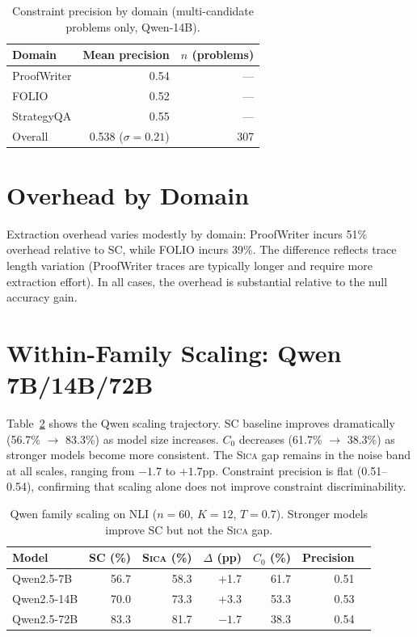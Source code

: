 \documentclass[11pt,a4paper]{article}
\newcommand{\sica}{\textsc{Sica}}
\newcommand{\czero}{C_0}
\begin{document}
\begin{table}[h]
\centering
\caption{Constraint precision by domain (multi-candidate problems only, Qwen-14B).}
\label{tab:precision}
\small
\begin{tabular}{lrr}
\toprule
\textbf{Domain} & \textbf{Mean precision} & \textbf{$n$ (problems)} \\
\midrule
ProofWriter & 0.54 & --- \\
FOLIO & 0.52 & --- \\
StrategyQA & 0.55 & --- \\
\midrule
Overall & 0.538 ($\sigma = 0.21$) & 307 \\
\bottomrule
\end{tabular}
\end{table}

\section{Overhead by Domain}
\label{app:overhead}

Extraction overhead varies modestly by domain: ProofWriter incurs 51\% overhead relative to SC, while FOLIO incurs 39\%. The difference reflects trace length variation (ProofWriter traces are typically longer and require more extraction effort). In all cases, the overhead is substantial relative to the null accuracy gain.

\section{Within-Family Scaling: Qwen 7B/14B/72B}
\label{app:scaling}

Table~\ref{tab:scaling} shows the Qwen scaling trajectory. SC baseline improves dramatically (56.7\% $\to$ 83.3\%) as model size increases. $\czero$ decreases (61.7\% $\to$ 38.3\%) as stronger models become more consistent. The \sica{} gap remains in the noise band at all scales, ranging from $-1.7$ to $+1.7$pp. Constraint precision is flat (0.51--0.54), confirming that scaling alone does not improve constraint discriminability.

\begin{table}[h]
\centering
\caption{Qwen family scaling on NLI ($n = 60$, $K = 12$, $T = 0.7$). Stronger models improve SC but not the \sica{} gap.}
\label{tab:scaling}
\small
\begin{tabular}{lrrrrrr}
\toprule
\textbf{Model} & \textbf{SC (\%)} & \textbf{\sica{} (\%)} & \textbf{$\Delta$ (pp)} & \textbf{$\czero$ (\%)} & \textbf{Precision} \\
\midrule
Qwen2.5-7B   & 56.7 & 58.3 & +1.7  & 61.7 & 0.51 \\
Qwen2.5-14B  & 70.0 & 73.3 & +3.3  & 53.3 & 0.53 \\
Qwen2.5-72B  & 83.3 & 81.7 & $-1.7$ & 38.3 & 0.54 \\
\bottomrule
\end{tabular}
\end{table}
\end{document}
